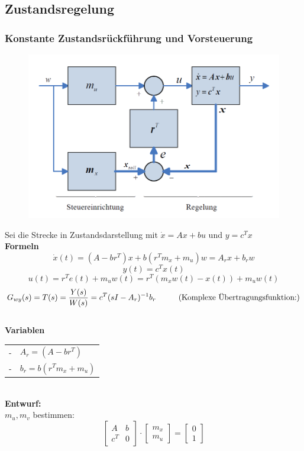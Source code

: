 \documentclass[10pt,a4paper]{article}
\newcommand{\tab}[1][1]{\hspace*{#1cm}}
\newcommand{\vect}[1]{\ensuremath{\begin{bmatrix}#1\end{bmatrix}}}
\begin{document}
\subsection{Zustandsregelung}
\subsubsection{Konstante Zustandsrückführung und Vorsteuerung}
\label{zustandsrueckfuehrung}
\begin{figure}[H]
	\includegraphics[width=0.7\columnwidth]{imgs/abb7_10.png}
\end{figure}

Sei die Strecke in Zustandsdarstellung mit $\dot x = Ax + bu$ und $y = c^T x$ \\

\textbf{Formeln}
$$
	\dot x(t) = (A - br^T)x + b(r^T m_x + m_u) w = A_r x + b_r w
$$
$$
	y(t) = c^Tx(t)
$$
$$
	u(t) = r^Te(t) + m_uw(t) = r^T(m_xw(t)-x(t)) + m_u w(t)
$$
$$
	G_{wy}(s) = T(s) = \frac{Y(s)}{W(s)} = c^T(sI-A_r)^{-1}b_r \tab (\text{Komplexe Übertragungsfunktion:})
$$ ~\\

\textbf{Variablen} ~\\
\begin{tabularx}{\columnwidth}{ll}
	\tab - & $A_r = (A - br^T)$ \\
	\tab - & $b_r = b(r^Tm_x + m_u)$ \\
\end{tabularx} ~\\

\textbf{Entwurf:} ~\\
$m_u, m_v$ bestimmen: ~\\
$$
	\vect{A & b \\ c^T & 0} ⋅ \vect{m_x \\ m_u} = \vect{0 \\ 1}
$$
\end{document}
